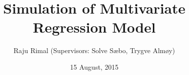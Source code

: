 \documentclass[9pt, final]{beamer}\usepackage[]{graphicx}\usepackage[]{color}
\title{Simulation of Multivariate Regression Model}
\author{Raju Rimal (Supervisors: Solve S{\ae}bo, Trygve Alm{\o}y)}
\institute[Norwegian University of Life Sciences (NMBU)]{Norwegian University of Life Sciences (NMBU), {\AA}s, Norway}
\date[15 August, 2015]{15 August, 2015}
\begin{document}
\begin{frame}[fragile]

\end{frame}
\end{document}
